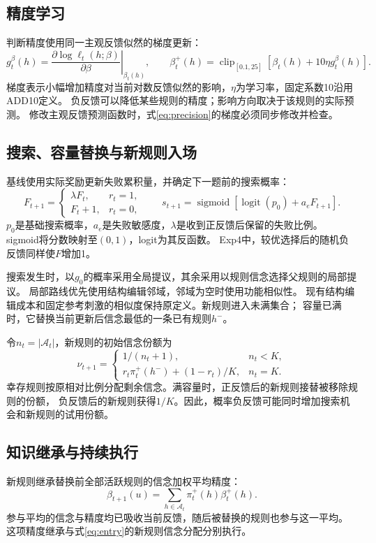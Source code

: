 \documentclass[11pt,a4paper]{article}
\numberwithin{equation}{section}
\newcommand{\A}{\mathcal A}
\newcommand{\clip}{\operatorname{clip}}
\newcommand{\sigmoid}{\operatorname{sigmoid}}
\newcommand{\logit}{\operatorname{logit}}
\begin{document}
\subsection{精度学习}
判断精度使用同一主观反馈似然的梯度更新：
\begin{equation}
g_t^\beta(h)=\left.\frac{\partial\log\ell_t(h;\beta)}{\partial\beta}\right|_{\beta_t(h)},
\qquad
\beta_t^+(h)=\clip_{[0.1,25]}[\beta_t(h)+10\eta g_t^\beta(h)].
\label{eq:precision}
\end{equation}
梯度表示小幅增加精度对当前对数反馈似然的影响，$\eta$为学习率，固定系数10沿用ADD10定义。
负反馈可以降低某些规则的精度；影响方向取决于该规则的实际预测。
修改主观反馈预测函数时，式\eqref{eq:precision}的梯度必须同步修改并检查。

\subsection{搜索、容量替换与新规则入场}
基线使用实际奖励更新失败累积量，并确定下一题前的搜索概率：
\begin{equation}
F_{t+1}=\begin{cases}\lambda F_t,&r_t=1,\\ F_t+1,&r_t=0,\end{cases}
\qquad
s_{t+1}=\sigmoid[\logit(p_0)+a_eF_{t+1}].
\label{eq:search}
\end{equation}
$p_0$是基础搜索概率，$a_e$是失败敏感度，$\lambda$是收到正反馈后保留的失败比例。
sigmoid将分数映射至$(0,1)$，logit为其反函数。
Exp4中，较优选择后的随机负反馈同样使$F$增加1。

搜索发生时，以$g_0$的概率采用全局提议，其余采用以规则信念选择父规则的局部提议。
局部路线优先使用结构编辑邻域，邻域为空时使用功能相似性。
现有结构编辑成本和固定参考刺激的相似度保持原定义。新规则进入未满集合；
容量已满时，它替换当前更新后信念最低的一条已有规则$h^-$。

令$n_t=|\A_t|$，新规则的初始信念份额为
\begin{equation}
\nu_{t+1}=\begin{cases}
1/(n_t+1),& n_t<K,\\
r_t\pi_t^+(h^-)+(1-r_t)/K,&n_t=K.
\end{cases}
\label{eq:entry}
\end{equation}
幸存规则按原相对比例分配剩余信念。满容量时，正反馈后的新规则接替被移除规则的份额，
负反馈后的新规则获得$1/K$。因此，概率负反馈可能同时增加搜索机会和新规则的试用份额。

\subsection{知识继承与持续执行}
新规则继承替换前全部活跃规则的信念加权平均精度：
\begin{equation}
\beta_{t+1}(u)=\sum_{h\in\A_t}\pi_t^+(h)\beta_t^+(h).
\end{equation}
参与平均的信念与精度均已吸收当前反馈，随后被替换的规则也参与这一平均。
这项精度继承与式\eqref{eq:entry}的新规则信念分配分别执行。
\end{document}
